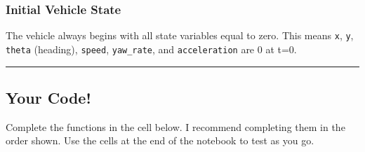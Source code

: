 \documentclass[11pt]{article}
\begin{document}
    \hypertarget{initial-vehicle-state}{%
\subsubsection{Initial Vehicle State}\label{initial-vehicle-state}}

The vehicle always begins with all state variables equal to zero. This
means \texttt{x}, \texttt{y}, \texttt{theta} (heading), \texttt{speed},
\texttt{yaw\_rate}, and \texttt{acceleration} are 0 at t=0.

    \begin{center}\rule{0.5\linewidth}{\linethickness}\end{center}

    \hypertarget{your-code}{%
\subsection{Your Code!}\label{your-code}}

Complete the functions in the cell below. I recommend completing them in
the order shown. Use the cells at the end of the notebook to test as you
go.
\end{document}
